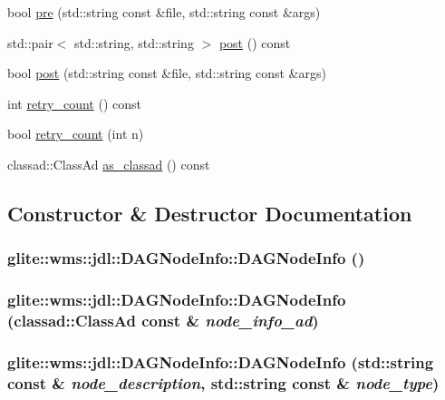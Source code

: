 \begin{CompactItemize}
\item 
bool \hyperlink{classglite_1_1wms_1_1jdl_1_1DAGNodeInfo_a12}{pre} (std::string const \&file, std::string const \&args)
\item 
std::pair$<$ std::string, std::string $>$ \hyperlink{classglite_1_1wms_1_1jdl_1_1DAGNodeInfo_a13}{post} () const 
\item 
bool \hyperlink{classglite_1_1wms_1_1jdl_1_1DAGNodeInfo_a14}{post} (std::string const \&file, std::string const \&args)
\item 
int \hyperlink{classglite_1_1wms_1_1jdl_1_1DAGNodeInfo_a15}{retry\_\-count} () const 
\item 
bool \hyperlink{classglite_1_1wms_1_1jdl_1_1DAGNodeInfo_a16}{retry\_\-count} (int n)
\item 
classad::Class\-Ad \hyperlink{classglite_1_1wms_1_1jdl_1_1DAGNodeInfo_a17}{as\_\-classad} () const 
\end{CompactItemize}


\subsection{Constructor \& Destructor Documentation}
\hypertarget{classglite_1_1wms_1_1jdl_1_1DAGNodeInfo_a0}{
\subsubsection[DAGNodeInfo]{\setlength{\rightskip}{0pt plus 5cm}glite::wms::jdl::DAGNode\-Info::DAGNode\-Info ()}}
\label{classglite_1_1wms_1_1jdl_1_1DAGNodeInfo_a0}


\hypertarget{classglite_1_1wms_1_1jdl_1_1DAGNodeInfo_a1}{
\subsubsection[DAGNodeInfo]{\setlength{\rightskip}{0pt plus 5cm}glite::wms::jdl::DAGNode\-Info::DAGNode\-Info (classad::Class\-Ad const \& {\em node\_\-info\_\-ad})}}
\label{classglite_1_1wms_1_1jdl_1_1DAGNodeInfo_a1}


\hypertarget{classglite_1_1wms_1_1jdl_1_1DAGNodeInfo_a2}{
\subsubsection[DAGNodeInfo]{\setlength{\rightskip}{0pt plus 5cm}glite::wms::jdl::DAGNode\-Info::DAGNode\-Info (std::string const \& {\em node\_\-description}, std::string const \& {\em node\_\-type})}}
\label{classglite_1_1wms_1_1jdl_1_1DAGNodeInfo_a2}



